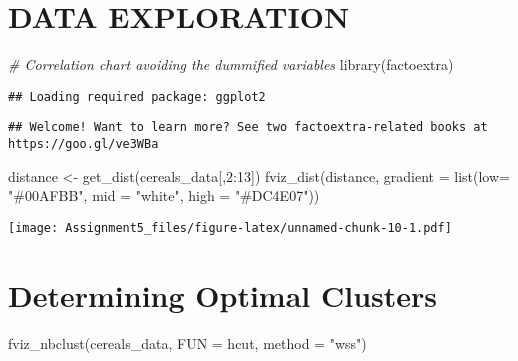 \documentclass[
]{article}
\newenvironment{Shaded}{\begin{snugshade}}{\end{snugshade}}
\newcommand{\AttributeTok}[1]{\textcolor[rgb]{0.77,0.63,0.00}{#1}}
\newcommand{\CommentTok}[1]{\textcolor[rgb]{0.56,0.35,0.01}{\textit{#1}}}
\newcommand{\DecValTok}[1]{\textcolor[rgb]{0.00,0.00,0.81}{#1}}
\newcommand{\FunctionTok}[1]{\textcolor[rgb]{0.00,0.00,0.00}{#1}}
\newcommand{\NormalTok}[1]{#1}
\newcommand{\OtherTok}[1]{\textcolor[rgb]{0.56,0.35,0.01}{#1}}
\newcommand{\SpecialCharTok}[1]{\textcolor[rgb]{0.00,0.00,0.00}{#1}}
\newcommand{\StringTok}[1]{\textcolor[rgb]{0.31,0.60,0.02}{#1}}
\begin{document}
\hypertarget{data-exploration}{%
\section{DATA EXPLORATION}\label{data-exploration}}

\begin{Shaded}
\begin{Highlighting}[]
\CommentTok{\# Correlation chart avoiding the dummified variables}
\FunctionTok{library}\NormalTok{(factoextra)}
\end{Highlighting}
\end{Shaded}

\begin{verbatim}
## Loading required package: ggplot2
\end{verbatim}

\begin{verbatim}
## Welcome! Want to learn more? See two factoextra-related books at https://goo.gl/ve3WBa
\end{verbatim}

\begin{Shaded}
\begin{Highlighting}[]
\NormalTok{distance }\OtherTok{\textless{}{-}} \FunctionTok{get\_dist}\NormalTok{(cereals\_data[,}\DecValTok{2}\SpecialCharTok{:}\DecValTok{13}\NormalTok{])}
\FunctionTok{fviz\_dist}\NormalTok{(distance, }\AttributeTok{gradient =} \FunctionTok{list}\NormalTok{(}\AttributeTok{low=} \StringTok{"\#00AFBB"}\NormalTok{, }\AttributeTok{mid =} \StringTok{"white"}\NormalTok{, }\AttributeTok{high =} \StringTok{"\#DC4E07"}\NormalTok{))}
\end{Highlighting}
\end{Shaded}

\texttt{[image: Assignment5\_files/figure-latex/unnamed-chunk-10-1.pdf]}

\hypertarget{determining-optimal-clusters}{%
\section{Determining Optimal
Clusters}\label{determining-optimal-clusters}}

\begin{Shaded}
\begin{Highlighting}[]
\FunctionTok{fviz\_nbclust}\NormalTok{(cereals\_data, }\AttributeTok{FUN =}\NormalTok{ hcut, }\AttributeTok{method =} \StringTok{"wss"}\NormalTok{)}
\end{Highlighting}
\end{Shaded}
\end{document}
